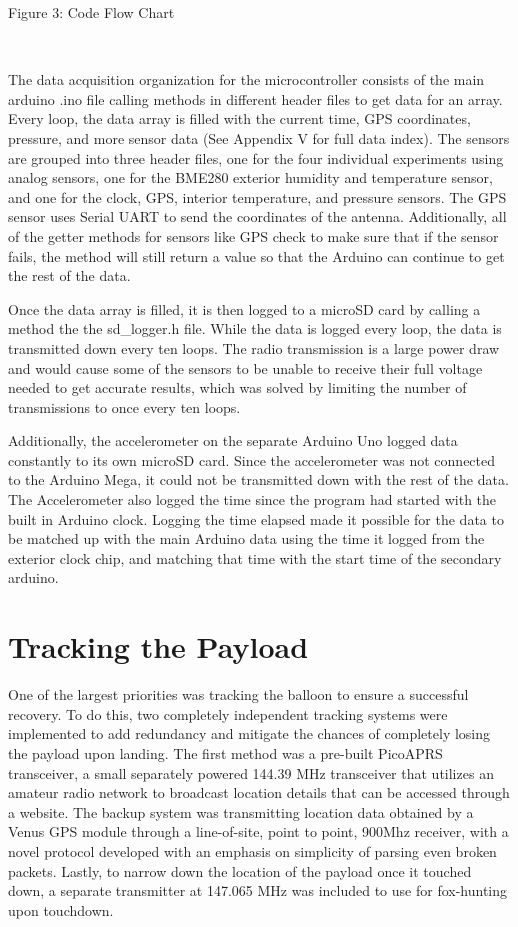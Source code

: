 \documentclass[12pt,]{article}
\begin{document}
Figure 3: Code Flow Chart

~

The data acquisition organization for the microcontroller consists of
the main arduino .ino file calling methods in different header files to
get data for an array. Every loop, the data array is filled with the
current time, GPS coordinates, pressure, and more sensor data (See
Appendix V for full data index). The sensors are grouped into three
header files, one for the four individual experiments using analog
sensors, one for the BME280 exterior humidity and temperature sensor,
and one for the clock, GPS, interior temperature, and pressure sensors.
The GPS sensor uses Serial UART to send the coordinates of the antenna.
Additionally, all of the getter methods for sensors like GPS check to
make sure that if the sensor fails, the method will still return a value
so that the Arduino can continue to get the rest of the data.

Once the data array is filled, it is then logged to a microSD card by
calling a method the the sd\_logger.h file. While the data is logged
every loop, the data is transmitted down every ten loops. The radio
transmission is a large power draw and would cause some of the sensors
to be unable to receive their full voltage needed to get accurate
results, which was solved by limiting the number of transmissions to
once every ten loops.

Additionally, the accelerometer on the separate Arduino Uno logged data
constantly to its own microSD card. Since the accelerometer was not
connected to the Arduino Mega, it could not be transmitted down with the
rest of the data. The Accelerometer also logged the time since the
program had started with the built in Arduino clock. Logging the time
elapsed made it possible for the data to be matched up with the main
Arduino data using the time it logged from the exterior clock chip, and
matching that time with the start time of the secondary arduino.

\section{Tracking the Payload}\label{tracking-the-payload}

One of the largest priorities was tracking the balloon to ensure a
successful recovery. To do this, two completely independent tracking
systems were implemented to add redundancy and mitigate the chances of
completely losing the payload upon landing. The first method was a
pre-built PicoAPRS transceiver, a small separately powered 144.39 MHz
transceiver that utilizes an amateur radio network to broadcast location
details that can be accessed through a website. The backup system was
transmitting location data obtained by a Venus GPS module through a
line-of-site, point to point, 900Mhz receiver, with a novel protocol
developed with an emphasis on simplicity of parsing even broken packets.
Lastly, to narrow down the location of the payload once it touched down,
a separate transmitter at 147.065 MHz was included to use for
fox-hunting upon touchdown.
\end{document}
